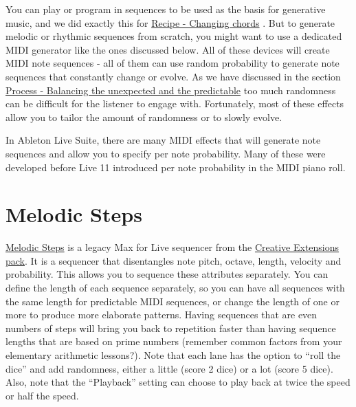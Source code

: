 \documentclass[
  12pt,
  letterpaper,
  oneside,
  open=any]{scrbook}
\begin{document}
\begin{tcolorbox}[enhanced jigsaw, breakable, left=2mm, leftrule=.75mm, toprule=.15mm, opacitybacktitle=0.6, toptitle=1mm, coltitle=black, colback=white, colbacktitle=quarto-callout-tip-color!10!white, opacityback=0, rightrule=.15mm, bottomrule=.15mm, titlerule=0mm, title=\textcolor{quarto-callout-tip-color}{\faLightbulb}\hspace{0.5em}{Key idea}, arc=.35mm, bottomtitle=1mm, colframe=quarto-callout-tip-color-frame]

You can play or program in sequences to be used as the basis for
generative music, and we did exactly this for
\hyperref[Chapter-001-Recipe-Changing_Chords]{Recipe - Changing chords}
. But to generate melodic or rhythmic sequences from scratch, you might
want to use a dedicated MIDI generator like the ones discussed below.
All of these devices will create MIDI note sequences - all of them can
use random probability to generate note sequences that constantly change
or evolve. As we have discussed in the section
\hyperref[Chapter-008-Process-Balance_unexpected_and_predictable]{Process
- Balancing the unexpected and the predictable} too much randomness can
be difficult for the listener to engage with. Fortunately, most of these
effects allow you to tailor the amount of randomness or to slowly
evolve.

\end{tcolorbox}

In Ableton Live Suite, there are many MIDI effects that will generate
note sequences and allow you to specify per note probability. Many of
these were developed before Live 11 introduced per note probability in
the MIDI piano roll.

\section{Melodic Steps}\label{melodic-steps}

\href{https://www.youtube.com/watch?v=ev2GgU1D8jw}{Melodic Steps} is a
legacy Max for Live sequencer from the
\href{https://www.ableton.com/en/packs/creative-extensions/}{Creative
Extensions pack}. It is a sequencer that disentangles note pitch,
octave, length, velocity and probability. This allows you to sequence
these attributes separately. You can define the length of each sequence
separately, so you can have all sequences with the same length for
predictable MIDI sequences, or change the length of one or more to
produce more elaborate patterns. Having sequences that are even numbers
of steps will bring you back to repetition faster than having sequence
lengths that are based on prime numbers (remember common factors from
your elementary arithmetic lessons?). Note that each lane has the option
to ``roll the dice'' and add randomness, either a little (score 2 dice)
or a lot (score 5 dice). Also, note that the ``Playback'' setting can
choose to play back at twice the speed or half the speed.
\end{document}
